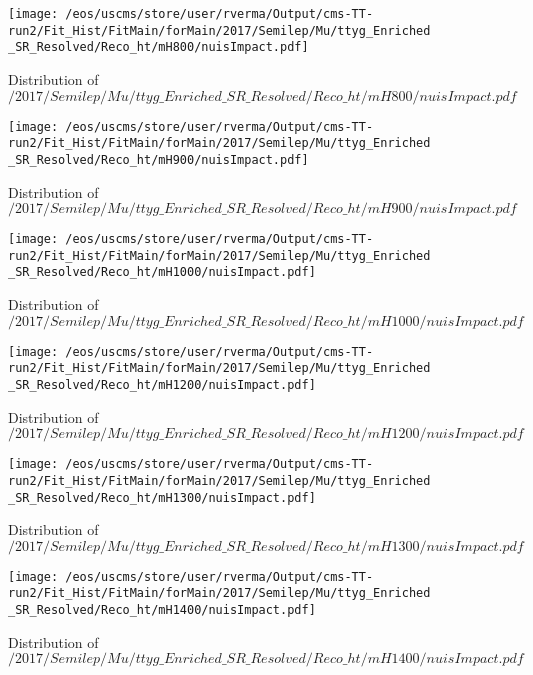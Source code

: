 \begin{figure}
\centering
\texttt{[image: /eos/uscms/store/user/rverma/Output/cms-TT-run2/Fit\_Hist/FitMain/forMain/2017/Semilep/Mu/ttyg\_Enriched\_SR\_Resolved/Reco\_ht/mH800/nuisImpact.pdf]}
\caption{Distribution of $/2017/Semilep/Mu/ttyg\_Enriched\_SR\_Resolved/Reco\_ht/mH800/nuisImpact.pdf$}
\end{figure}

\begin{figure}
\centering
\texttt{[image: /eos/uscms/store/user/rverma/Output/cms-TT-run2/Fit\_Hist/FitMain/forMain/2017/Semilep/Mu/ttyg\_Enriched\_SR\_Resolved/Reco\_ht/mH900/nuisImpact.pdf]}
\caption{Distribution of $/2017/Semilep/Mu/ttyg\_Enriched\_SR\_Resolved/Reco\_ht/mH900/nuisImpact.pdf$}
\end{figure}

\begin{figure}
\centering
\texttt{[image: /eos/uscms/store/user/rverma/Output/cms-TT-run2/Fit\_Hist/FitMain/forMain/2017/Semilep/Mu/ttyg\_Enriched\_SR\_Resolved/Reco\_ht/mH1000/nuisImpact.pdf]}
\caption{Distribution of $/2017/Semilep/Mu/ttyg\_Enriched\_SR\_Resolved/Reco\_ht/mH1000/nuisImpact.pdf$}
\end{figure}

\begin{figure}
\centering
\texttt{[image: /eos/uscms/store/user/rverma/Output/cms-TT-run2/Fit\_Hist/FitMain/forMain/2017/Semilep/Mu/ttyg\_Enriched\_SR\_Resolved/Reco\_ht/mH1200/nuisImpact.pdf]}
\caption{Distribution of $/2017/Semilep/Mu/ttyg\_Enriched\_SR\_Resolved/Reco\_ht/mH1200/nuisImpact.pdf$}
\end{figure}

\begin{figure}
\centering
\texttt{[image: /eos/uscms/store/user/rverma/Output/cms-TT-run2/Fit\_Hist/FitMain/forMain/2017/Semilep/Mu/ttyg\_Enriched\_SR\_Resolved/Reco\_ht/mH1300/nuisImpact.pdf]}
\caption{Distribution of $/2017/Semilep/Mu/ttyg\_Enriched\_SR\_Resolved/Reco\_ht/mH1300/nuisImpact.pdf$}
\end{figure}

\begin{figure}
\centering
\texttt{[image: /eos/uscms/store/user/rverma/Output/cms-TT-run2/Fit\_Hist/FitMain/forMain/2017/Semilep/Mu/ttyg\_Enriched\_SR\_Resolved/Reco\_ht/mH1400/nuisImpact.pdf]}
\caption{Distribution of $/2017/Semilep/Mu/ttyg\_Enriched\_SR\_Resolved/Reco\_ht/mH1400/nuisImpact.pdf$}
\end{figure}

